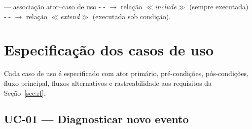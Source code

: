 \begin{legendadiag}
\textcolor{pmxBlue}{---} associação ator--caso de uso \quad
\textcolor{pmxGreen}{- - $\rightarrow$} relação $\ll$\textit{include}$\gg$
(sempre executada) \quad
\textcolor{pmxOrange}{- - $\rightarrow$} relação $\ll$\textit{extend}$\gg$
(executada sob condição).
\end{legendadiag}

\section{Especificação dos casos de uso}

Cada caso de uso é especificado com ator primário, pré-condições,
pós-condições, fluxo principal, fluxos alternativos e rastreabilidade aos
requisitos da Seção~\ref{sec:rf}.

\subsection{UC-01 --- Diagnosticar novo evento}

